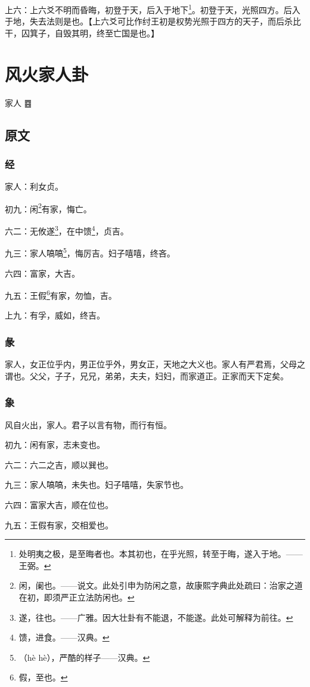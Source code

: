 \documentclass[12pt,oneside]{book}
\begin{document}
上六：上六爻不明而昏晦，初登于天，后入于地下\footnote{处明夷之极，是至晦者也。本其初也，在乎光照，转至于晦，遂入于地。——王弼。}。初登于天，光照四方。后入于地，失去法则是也。【上六爻可比作纣王初是权势光照于四方的天子，而后杀比干，囚箕子，自毁其明，终至亡国是也。】


\chapter{风火家人卦}
家人 {\Large ䷤}

\section{原文}

\subsection{经}
家人：利女贞。

初九：闲\footnote{闲，阑也。——说文。此处引申为防闲之意，故康熙字典此处疏曰：治家之道在初，即须严正立法防闲也。}有家，悔亡。

六二：无攸遂\footnote{遂，往也。——广雅。因大壮卦有不能退，不能遂。此处可解释为前往。}，在中馈\footnote{馈，进食。——汉典。}，贞吉。

九三：家人嗃嗃\footnote{（hè hè），严酷的样子——汉典。}，悔厉吉。妇子嘻嘻，终吝。

六四：富家，大吉。

九五：王假\footnote{假，至也。}有家，勿恤，吉。

上九：有孚，威如，终吉。

\subsection{彖}
家人，女正位乎内，男正位乎外，男女正，天地之大义也。家人有严君焉，父母之谓也。父父，子子，兄兄，弟弟，夫夫，妇妇，而家道正。正家而天下定矣。

\subsection{象}
风自火出，家人。君子以言有物，而行有恒。

初九：闲有家，志未变也。

六二：六二之吉，顺以巽也。

九三：家人嗃嗃，未失也。妇子嘻嘻，失家节也。

六四：富家大吉，顺在位也。

九五：王假有家，交相爱也。
\end{document}
